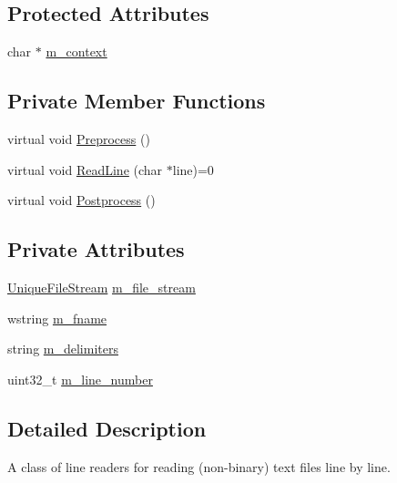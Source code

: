 \subsection*{Protected Attributes}
\begin{DoxyCompactItemize}
\item 
char $\ast$ \hyperlink{classmage_1_1_line_reader_a2f1cfe313dc89741386178e63a6b8b0c}{m\+\_\+context}
\end{DoxyCompactItemize}
\subsection*{Private Member Functions}
\begin{DoxyCompactItemize}
\item 
virtual void \hyperlink{classmage_1_1_line_reader_a4de135cfb0434be786cfcfd7959031ef}{Preprocess} ()
\item 
virtual void \hyperlink{classmage_1_1_line_reader_acfb2f7279ec77d070a86d7db812d4745}{Read\+Line} (char $\ast$line)=0
\item 
virtual void \hyperlink{classmage_1_1_line_reader_adfde21013140a1058d3dd567204abfb5}{Postprocess} ()
\end{DoxyCompactItemize}
\subsection*{Private Attributes}
\begin{DoxyCompactItemize}
\item 
\hyperlink{namespacemage_a4250d57cb76846bd81137e496ca41148}{Unique\+File\+Stream} \hyperlink{classmage_1_1_line_reader_a510ff5355c6d26d7c29dc692ef18a3e2}{m\+\_\+file\+\_\+stream}
\item 
wstring \hyperlink{classmage_1_1_line_reader_ad6f55ba12fc610ab2fc1c26a48d12321}{m\+\_\+fname}
\item 
string \hyperlink{classmage_1_1_line_reader_a6de3398ac59fdd98f8c40cff6f5c1075}{m\+\_\+delimiters}
\item 
uint32\+\_\+t \hyperlink{classmage_1_1_line_reader_ada0b4ec5817b96c6b1bb43bd2573f8ba}{m\+\_\+line\+\_\+number}
\end{DoxyCompactItemize}


\subsection{Detailed Description}
A class of line readers for reading (non-\/binary) text files line by line. 

